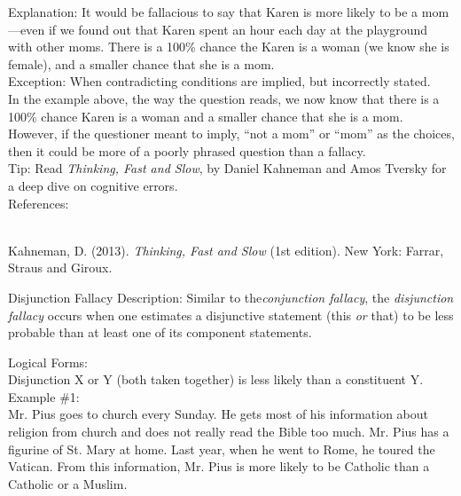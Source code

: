 \documentclass[a4paper,12pt,single,pdftex]{scrbook}
\begin{document}
    
      Explanation: It would be fallacious to say that Karen is more likely to be a mom—even if we found out that Karen spent an hour each day at the playground with other moms. There is a 100\% chance the Karen is a woman (we know she is female), and a smaller chance that she is a mom.
    \\

    
      Exception: When contradicting conditions are implied, but incorrectly stated.
    \\

    
      In the example above, the way the question reads, we now know that there is a 100\% chance Karen is a woman and a smaller chance that she is a mom. However, if the questioner meant to imply, “not a mom” or “mom” as the choices, then it could be more of a poorly phrased question than a fallacy.
    \\

    
      Tip: Read {\em Thinking, Fast and Slow}, by Daniel Kahneman and Amos Tversky for a deep dive on cognitive errors.
    \\

    References:

    
      
        
      \\

      
        
          Kahneman, D. (2013). {\it Thinking, Fast and Slow} (1st edition). New York: Farrar, Straus and Giroux.
        
      
    
  

Disjunction Fallacy
    Description: Similar to the{\em  {\it conjunction fallacy}}, the {\em disjunction fallacy} occurs when one estimates a disjunctive statement (this {\em or} that) to be less probable than at least one of its component statements.

    
      Logical Forms:
    \\

    
      Disjunction X or Y (both taken together) is less likely than a constituent Y.
    \\

    
      Example \#1:
    \\

    
      Mr. Pius goes to church every Sunday.  He gets most of his information about religion from church and does not really read the Bible too much.  Mr. Pius has a figurine of St. Mary at home.  Last year, when he went to Rome, he toured the Vatican.  From this information, Mr. Pius is more likely to be Catholic than a Catholic or a Muslim.
    \\
\end{document}
